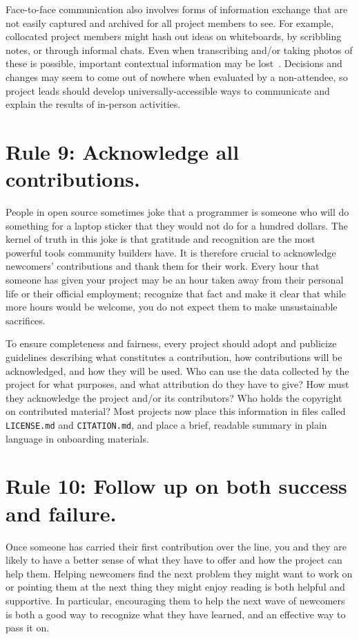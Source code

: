 \documentclass[10pt,letterpaper]{article}
\newcommand{\rulemajor}[1]{\section*{#1}}
\begin{document}
Face-to-face communication also involves forms of information exchange
that are not easily captured and archived for all project members to see.
For example,
collocated project members might hash out ideas on whiteboards,
by scribbling notes,
or through informal chats.
Even when transcribing and/or taking photos of these is possible,
important contextual information may be lost~\cite{cherubini2007}.
Decisions and changes may seem to come out of nowhere when evaluated by a non-attendee,
so project leads should develop universally-accessible ways to communicate and explain the results of in-person activities.

\rulemajor{Rule 9: Acknowledge all contributions.}

People in open source sometimes joke that
a programmer is someone who will do something for a laptop sticker
that they would not do for a hundred dollars.
The kernel of truth in this joke is that
gratitude and recognition are the most powerful tools community builders have.
It is therefore crucial to acknowledge newcomers' contributions and thank them for their work.
Every hour that someone has given your project may be an hour taken away from their personal life
or their official employment;
recognize that fact
and make it clear that while more hours would be welcome,
you do not expect them to make unsustainable sacrifices.

To ensure completeness and fairness,
every project should adopt and publicize guidelines describing
what constitutes a contribution,
how contributions will be acknowledged,
and how they will be used.
Who can use the data collected by the project for what purposes,
and what attribution do they have to give?
How must they acknowledge the project and/or its contributors?
Who holds the copyright on contributed material?
Most projects now place this information in files called \texttt{LICENSE.md} and \texttt{CITATION.md},
and place a brief, readable summary in plain language in onboarding materials.

\rulemajor{Rule 10: Follow up on both success and failure.}

Once someone has carried their first contribution over the line,
you and they are likely to have a better sense of what they have to offer
and how the project can help them.
Helping newcomers find the next problem they might want to work on
or pointing them at the next thing they might enjoy reading
is both helpful and supportive.
In particular,
encouraging them to help the next wave of newcomers
is both a good way to recognize what they have learned,
and an effective way to pass it on.
\end{document}
